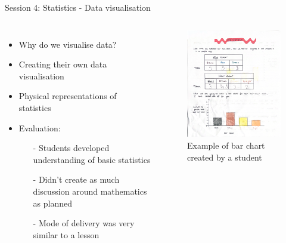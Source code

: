 \documentclass{beamer}  %
\begin{document}
\begin{frame}{Session 4: Statistics - Data visualisation}
    \begin{columns}
            \begin{itemize}
                \item Why do we visualise data?
                \item Creating their own data visualisation
                \item Physical representations of statistics
                \item Evaluation:
                \begin{itemize}
                    \item[-] Students developed understanding of basic statistics
                    \item[-] Didn't create as much discussion around mathematics as planned
                    \item[-] Mode of delivery was very similar to a lesson 
                \end{itemize}
            \end{itemize}
        \begin{figure}
            \includegraphics[scale = 0.4]{Images/Presenting_data.png}
            \caption{Example of bar chart created by a student}
        \end{figure}
    \end{columns}

\end{frame}
\end{document}
